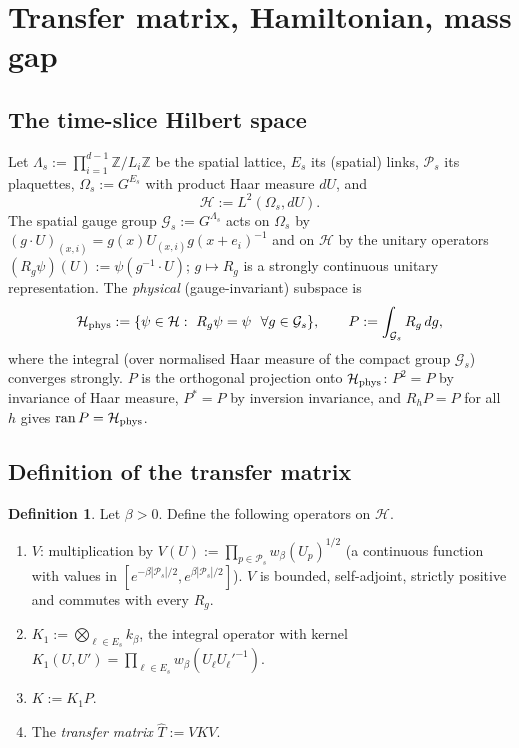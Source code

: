 \documentclass[11pt,a4paper]{article}
\theoremstyle{definition}
\newtheorem{definition}[theorem]{Definition}
\theoremstyle{remark}
\newcommand{\Z}{\mathbb{Z}}
\newcommand{\cH}{\mathcal{H}}
\newcommand{\cG}{\mathcal{G}}
\newcommand{\cP}{\mathcal{P}}
\newcommand{\hT}{\hat{T}}
\begin{document}
\section{Transfer matrix, Hamiltonian, mass gap}\label{sec:transfer}

\subsection{The time-slice Hilbert space}

Let $\Lambda_s:=\prod_{i=1}^{d-1}\Z/L_i\Z$ be the spatial lattice, $E_s$ its (spatial) links, $\cP_s$ its
plaquettes, $\Omega_s:=G^{E_s}$ with product Haar measure $dU$, and
\[
\cH:=L^2(\Omega_s,dU).
\]
The spatial gauge group $\cG_s:=G^{\Lambda_s}$ acts on $\Omega_s$ by $(g\cdot U)_{(x,i)}=g(x)U_{(x,i)}g(x+e_i)^{-1}$
and on $\cH$ by the unitary operators $(R_g\psi)(U):=\psi(g^{-1}\cdot U)$; $g\mapsto R_g$ is a strongly continuous
unitary representation. The \emph{physical} (gauge-invariant) subspace is
\[
\cH_{\rm phys}:=\{\psi\in\cH:\ R_g\psi=\psi\ \ \forall g\in\cG_s\},\qquad
P:=\int_{\cG_s}R_g\,dg ,
\]
where the integral (over normalised Haar measure of the compact group $\cG_s$) converges strongly. $P$ is the
orthogonal projection onto $\cH_{\rm phys}$: $P^2=P$ by invariance of Haar measure, $P^*=P$ by inversion invariance,
and $R_hP=P$ for all $h$ gives $\mathrm{ran}\,P=\cH_{\rm phys}$.

\subsection{Definition of the transfer matrix}

\begin{definition}\label{def:T}
Let $\beta>0$. Define the following operators on $\cH$.
\begin{enumerate}[label=(\roman*)]
\item $V$: multiplication by $V(U):=\prod_{p\in\cP_s}w_\beta(U_p)^{1/2}$ (a continuous function with values in
$[e^{-\beta|\cP_s|/2},e^{\beta|\cP_s|/2}]$). $V$ is bounded, self-adjoint, strictly positive and commutes with every $R_g$.
\item $K_1:=\bigotimes_{\ell\in E_s}k_\beta$, the integral operator with kernel
$K_1(U,U')=\prod_{\ell\in E_s}w_\beta(U_\ell U_\ell'^{-1})$.
\item $K:=K_1P$.
\item The \emph{transfer matrix} $\hT:=VKV$.
\end{enumerate}
\end{definition}
\end{document}
